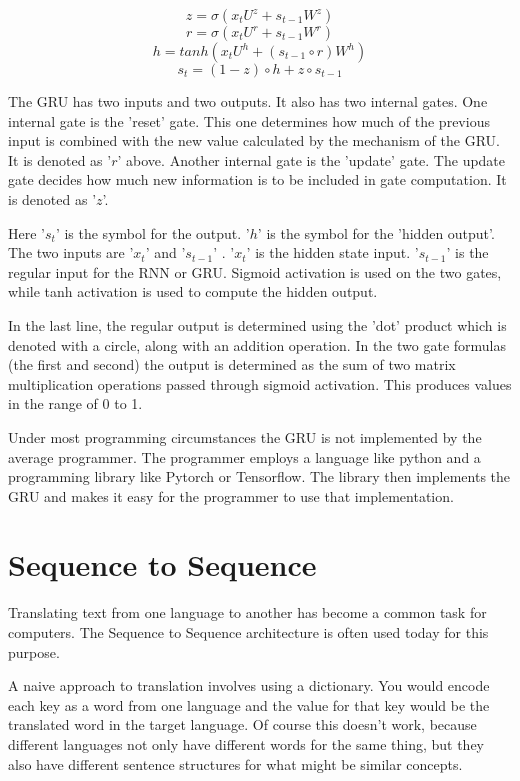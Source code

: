 $$ z =\sigma(x_tU^z + s_{t-1} W^z) $$  
$$ r =\sigma(x_t U^r +s_{t-1} W^r) $$  
$$ h = tanh(x_t U^h + (s_{t-1} \circ r) W^h) $$  
$$ s_t = (1 - z) \circ h + z \circ s_{t-1} $$  


The GRU has two inputs and two outputs. It also has two internal gates. One internal gate is the 'reset' gate. This one determines how much of the previous input is combined with the new value calculated by the mechanism of the GRU. It is denoted as '$r$' above. Another internal gate is the 'update' gate. The update gate decides how much new information is to be included in gate computation. It is denoted as '$z$'.

Here '$ s_t $' is the symbol for the output. '$h$' is the symbol for the 'hidden output'. The two inputs are '$ x_t $' and '$ s_{t-1} $' . '$ x_t $' is the hidden state input. '$ s_{t-1} $' is the regular input for the RNN or GRU. Sigmoid activation is used on the two gates, while tanh activation is used to compute the hidden output.

In the last line, the regular output is determined using the 'dot' product which is denoted with a circle, along with an addition operation. In the two gate formulas (the first and second) the output is determined as the sum of two matrix multiplication operations passed through sigmoid activation. This produces values in the range of 0 to 1.

Under most programming circumstances the GRU is not implemented by the average programmer. The programmer employs a language like python and a programming library like Pytorch or Tensorflow. The library then implements the GRU and makes it easy for the programmer to use that implementation.

\section{Sequence to Sequence}

Translating text from one language to another has become a common task for computers. The Sequence to Sequence architecture is often used today  for this purpose.

A naive approach to translation involves using a dictionary. You would encode each key as a word from one language and the value for that key would be the translated word in the target language. Of course this doesn't work, because different languages not only have different words for the same thing, but they also have different sentence structures for what might be similar concepts.

